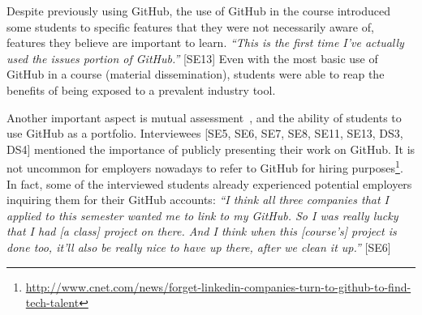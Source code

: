 Despite previously using GitHub, the use of GitHub in the course introduced some students to specific features that they were not necessarily aware of, features they believe are important to learn. \textit{``This is the first time I've actually used the issues portion of GitHub.''} [SE13] Even with the most basic use of GitHub in a course (material dissemination), students were able to reap the benefits of being exposed to a prevalent industry tool.


%
Another important aspect is mutual assessment~\cite{Singer2013}, and the ability of students to use GitHub as a portfolio. Interviewees [SE5, SE6, SE7, SE8, SE11, SE13, DS3, DS4] mentioned the importance of publicly presenting their work on GitHub. It is not uncommon for employers nowadays to refer to GitHub for hiring purposes\footnote{\url{http://www.cnet.com/news/forget-linkedin-companies-turn-to-github-to-find-tech-talent}}. In fact, some of the interviewed students already experienced potential employers inquiring them for their GitHub accounts: \textit{``I think all three companies that I applied to this semester wanted me to link to my GitHub. So I was really lucky that I had [a class] project on there. And I think when this [course's] project is done too, it'll also be really nice to have up there, after we clean it up.''} [SE6]

